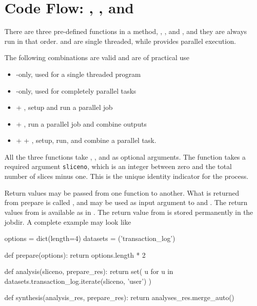 


\newpage
\section{Code Flow:  \prepare, \analysis, and \synthesis}

There are three pre-defined functions in a method, \prepare,
\analysis, and \synthesis, and they are always run in that order.
\prepare and \synthesis are single threaded, while \analysis provides
parallel execution.

The following combinations are valid and are of practical use
\begin{itemize}
\item \synthesis-only, used for a single threaded program
\item \analysis-only, used for completely parallel tasks
\item \prepare + \analysis, setup and run a parallel job
\item \analysis + \synthesis, run a parallel job and combine outputs
\item \prepare + \analysis + \synthesis, setup, run, and combine a
  parallel task.
\end{itemize}
All the three functions take \options, \jobids, and \datasets as
optional arguments.  The \analysis function takes a required argument
\texttt{sliceno}, which is an integer between zero and the total
number of slices minus one.  This is the unique identity indicator for
the \analysis process.

Return values may be passed from one function to another.  What is
returned from prepare is called \prepareres, and may be used as input
argument to \analysis and \synthesis.  The return values from
\analysis is available as \analysisres in \synthesis.  The return
value from \synthesis is stored permanently in the jobdir.  A complete
example may look like
\begin{python}
options = dict(length=4)
datasets = ('transaction_log')

def prepare(options):
  return options.length * 2

def analysis(sliceno, prepare_res):
  return set(
    u for u in datasets.transaction_log.iterate(sliceno, 'user')
  )

def synthesis(analysis_res, prepare_res):
   return analyses_res.merge_auto()
\end{python}



